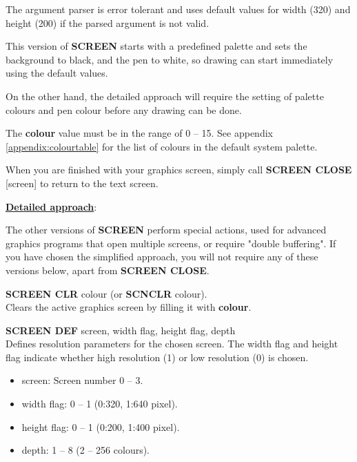 \begin{description}[leftmargin=2cm,style=nextline]
                  The argument parser is error tolerant and uses default values for width (320) and height (200) if the parsed argument is not valid.

                  This version of {\bf SCREEN} starts with a predefined palette and sets the background to black, and the pen to white, so drawing can start immediately using the default values.

                  On the other hand, the detailed approach will require the setting of palette colours and pen colour before any drawing can be done.

                  The {\bf colour} value must be in the range of 0 -- 15. See appendix \vref{appendix:colourtable} for the list of colours in the default system palette.

                  When you are finished with your graphics screen, simply call {\bf SCREEN CLOSE} [screen] to return to the text screen.

                  \underline{{\bf Detailed approach}}:

                  The other versions of {\bf SCREEN} perform special actions, used for advanced graphics programs that open multiple screens, or require "double buffering". If you have chosen the simplified approach, you will not require any of these versions below, apart from {\bf SCREEN CLOSE}.

                  {\bf SCREEN CLR} colour (or {\bf SCNCLR} colour). \\
                  Clears the active graphics screen by filling it with {\bf colour}.

                  {\bf SCREEN DEF} screen, width flag, height flag, depth \\
                  Defines resolution parameters for the chosen screen. The width flag and height flag indicate whether high resolution (1) or low resolution (0) is chosen.

                  \begin{itemize}
                     \item screen: Screen number 0 -- 3.
                     \item width flag: 0 -- 1 (0:320, 1:640 pixel).
                     \item height flag: 0 -- 1 (0:200, 1:400 pixel).
                     \item depth: 1 -- 8 (2 -- 256 colours).
                  \end{itemize}


\end{description}
